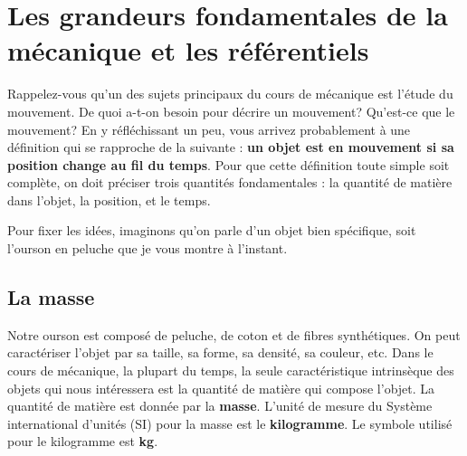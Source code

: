 \section{Les grandeurs fondamentales de la mécanique et les référentiels}

Rappelez-vous qu'un des sujets principaux du cours de mécanique est l'étude du
mouvement.  De quoi a-t-on besoin pour décrire un mouvement?  Qu'est-ce que le
mouvement?    En y réfléchissant un peu,
vous arrivez probablement à une définition qui se rapproche de la suivante :
\textbf{un objet est en mouvement si sa position change au fil du temps}.
Pour que cette définition toute simple soit complète, on doit préciser trois
quantités fondamentales : la quantité de matière dans l'objet, la position, et
le temps.

Pour fixer les idées, imaginons qu'on parle d'un objet bien spécifique, soit
l'ourson en peluche que je vous montre à l'instant.

\begin{marginfigure}
\end{marginfigure}

\subsection{La masse}

Notre ourson est composé de peluche, de coton et de fibres synthétiques.  On
peut caractériser l'objet par sa taille, sa forme, sa densité, sa couleur, etc.
Dans le cours de mécanique, la plupart du temps, la seule caractéristique
intrinsèque des objets qui nous intéressera est la quantité de matière qui
compose l'objet.    La quantité de matière est donnée par
la \textbf{masse}.  L'unité de mesure du Système international d'unités (SI)
pour la masse est le \textbf{kilogramme}.  Le symbole utilisé pour le
kilogramme est \textbf{kg}.

